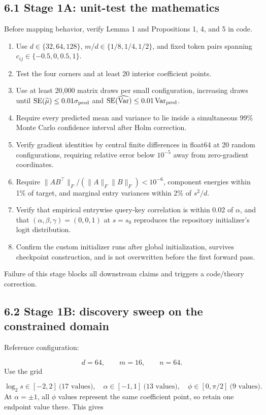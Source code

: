 \documentclass[11pt,letterpaper]{article}
\theoremstyle{definition}
\begin{document}
\subsection{6.1 Stage 1A: unit-test the mathematics}
Before mapping behavior, verify Lemma 1 and Propositions 1, 4, and 5 in code.

\begin{enumerate}
  \item Use $d\in\{32,64,128\}$, $m/d\in\{1/8,1/4,1/2\}$, and fixed token pairs spanning $c_{ij}\in\{-0.5,0,0.5,1\}$.
  \item Test the four corners and at least 20 interior coefficient points.
  \item Use at least 20,000 matrix draws per small configuration, increasing draws until $\operatorname{SE}(\widehat\mu)\le0.01\sigma_{\rm pred}$ and $\operatorname{SE}(\widehat{\operatorname{Var}})\le0.01\operatorname{Var}_{\rm pred}$.
  \item Require every predicted mean and variance to lie inside a simultaneous 99\% Monte Carlo confidence interval after Holm correction.
  \item Verify gradient identities by central finite differences in float64 at 20 random configurations, requiring relative error below $10^{-5}$ away from zero-gradient coordinates.
  \item Require $\|AB^\top\|_F/(\|A\|_F\|B\|_F)<10^{-6}$, component energies within 1\% of target, and marginal entry variances within 2\% of $s^2/d$.
  \item Verify that empirical entrywise query-key correlation is within 0.02 of $\alpha$, and that $(\alpha,\beta,\gamma)=(0,0,1)$ at $s=s_0$ reproduces the repository initializer's logit distribution.
  \item Confirm the custom initializer runs after global initialization, survives checkpoint construction, and is not overwritten before the first forward pass.
\end{enumerate}
Failure of this stage blocks all downstream claims and triggers a code/theory correction.

\subsection{6.2 Stage 1B: discovery sweep on the constrained domain}
Reference configuration:

\[
d=64,\qquad m=16,\qquad n=64.
\]
Use the grid

\[
\log_2s\in[-2,2]\ \text{(17 values)},\quad
\alpha\in[-1,1]\ \text{(13 values)},\quad
\phi\in[0,\pi/2]\ \text{(9 values)}.
\]
At $\alpha=\pm1$, all $\phi$ values represent the same coefficient point, so retain one endpoint value there. This gives
\end{document}
